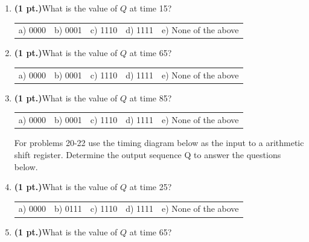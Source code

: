 \documentclass{article}
\begin{document}
\begin{enumerate}
\item {\bf (1 pt.)}What is the value of $Q$ at time 15?

\begin{tabular}{p{0.6in} p{0.6in} p{0.6in} p{0.6in} l}
a) 0000 & b) 0001 & c) 1110 & d) 1111 & e) None of the above
\end{tabular}

\item {\bf (1 pt.)}What is the value of $Q$ at time 65?

\begin{tabular}{p{0.6in} p{0.6in} p{0.6in} p{0.6in} l}
a) 0000 & b) 0001 & c) 1110 & d) 1111 & e) None of the above
\end{tabular}

\item {\bf (1 pt.)}What is the value of $Q$ at time 85?

\begin{tabular}{p{0.6in} p{0.6in} p{0.6in} p{0.6in} l}
a) 0000 & b) 0001 & c) 1110 & d) 1111 & e) None of the above
\end{tabular}

For problems 20-22 use the timing diagram below as the input to a arithmetic 
shift register.  Determine the output sequence Q to answer the questions
below.


\item {\bf (1 pt.)}What is the value of $Q$ at time 25?

\begin{tabular}{p{0.6in} p{0.6in} p{0.6in} p{0.6in} l}
a) 0000 & b) 0111 & c) 1110 & d) 1111 & e) None of the above
\end{tabular}

\item {\bf (1 pt.)}What is the value of $Q$ at time 65?


\end{enumerate}
\end{document}
